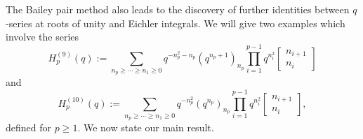 \documentclass[11pt,reqno]{amsart}
\theoremstyle{definition}
\numberwithin{equation}{section}
\renewcommand{\=}{\;=\;}
\begin{document}
The Bailey pair method also leads to the discovery of further identities between $q$-series at roots of unity and Eichler integrals.   We will give two examples which involve the series
\begin{equation} \label{h9}
	H_p^{(9)}(q) := \sum_{n_p \geq \cdots \geq n_1 \geq 0} q^{-n_p^2-n_p}(q^{n_p+1})_{n_p} \prod_{i=1}^{p-1} q^{n_i^2} \begin{bmatrix} n_{i+1} \\ n_i \end{bmatrix} 
\end{equation} 
and
\begin{equation} \label{h10}
	H_p^{(10)}(q) := \sum_{n_p \geq \cdots \geq n_1 \geq 0} q^{-n_p^2}(q^{n_p})_{n_p} \prod_{i=1}^{p-1} q^{n_i^2} \begin{bmatrix} n_{i+1} \\ n_i \end{bmatrix},
\end{equation}
defined for $p \geq 1$.   We now state our main result.
\end{document}
